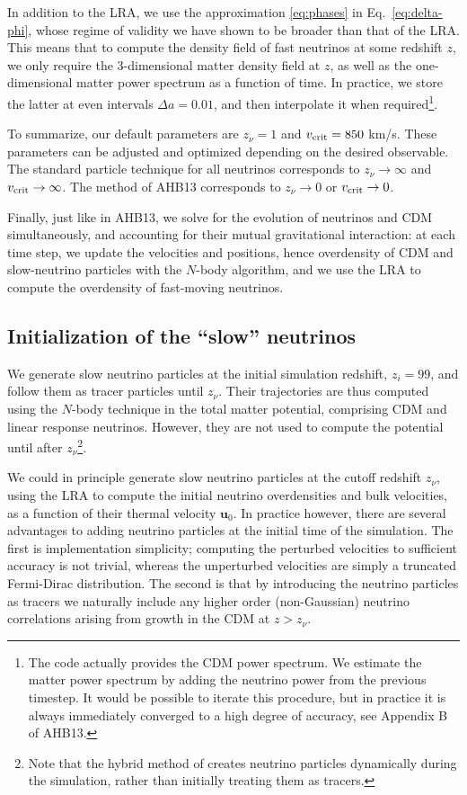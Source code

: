 \documentclass[useAMS, usenatbib]{mnras}
\newcommand{\bs}{\boldsymbol}
\begin{document}
In addition to the LRA, we use the approximation \eqref{eq:phases} in Eq.~\eqref{eq:delta-phi}, whose regime of validity we have shown to be broader than that of the LRA. This means that to compute the density field of fast neutrinos at some redshift $z$, we only require the 3-dimensional matter density field at $z$, as well as the one-dimensional matter power spectrum as a function of time. In practice, we store the latter at even intervals $\Delta a = 0.01$, and then interpolate it when required\footnote{The code actually provides the CDM power spectrum. We estimate the matter power spectrum by adding the neutrino power from the previous timestep. It would be possible to iterate this procedure, but in practice it is always immediately converged to a high degree of accuracy, see Appendix B of AHB13.}.

To summarize, our default parameters are $z_\nu = 1$ and $v_{\rm crit} = 850$ km/s. These parameters can be adjusted and optimized depending on the desired observable. The standard particle technique for all neutrinos corresponds to $z_\nu \rightarrow \infty$ and $v_{\rm crit} \rightarrow \infty$. The method of AHB13 corresponds to $z_\nu \rightarrow 0$ or $v_{\rm crit} \rightarrow 0$.

Finally, just like in AHB13, we solve for the evolution of neutrinos and CDM simultaneously, and accounting for their mutual gravitational interaction: at each time step, we update the velocities and positions, hence overdensity of CDM and slow-neutrino particles with the $N$-body algorithm, and we use the LRA to compute the overdensity of fast-moving neutrinos.

\subsection{Initialization of the ``slow'' neutrinos}

We generate slow neutrino particles at the initial simulation redshift, $z_i = 99$, and follow them as tracer particles until $z_\nu$. Their trajectories are thus computed using the $N$-body technique in the total matter potential, comprising CDM and linear response neutrinos. However, they are not used to compute the potential until after $z_\nu$\footnote{Note that the hybrid method of \cite{Brandbyge_2010} creates neutrino particles dynamically during the simulation, rather than initially treating them as tracers.}.

We could in principle generate slow neutrino particles at the cutoff redshift $z_\nu$, using the LRA to compute the initial neutrino overdensities and bulk velocities, as a function of their thermal velocity $\bs{u}_0$. In practice however, there are several advantages to adding neutrino particles at the initial time of the simulation. The first is implementation simplicity; computing the perturbed velocities to sufficient accuracy is not trivial, whereas the unperturbed velocities are simply a truncated Fermi-Dirac distribution. The second is that by introducing the neutrino particles as tracers we naturally include any higher order (non-Gaussian) neutrino correlations arising from growth in the CDM at $z > z_\nu$.
\end{document}
